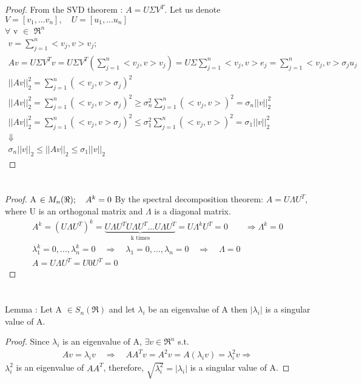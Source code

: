 \documentclass{article}
\begin{document}
	\section{}
	\begin{proof}
	From the SVD theorem : 
	$A=U\Sigma V^{T}.$
	Let us denote $V=[v_{1}, ... v_{n}],\quad U=[u_{1}, ... u_{n}]$ \\
	$\forall$ v $\in$ $\Re ^{n}$
	\begin{gather*}
	v = \sum_{j=1}^{n}<v_{j},v>v_{j}; \\
	Av=U\Sigma V^{T}v= U\Sigma V^{T}(\sum_{j=1}^{n}<v_{j},v>v_{j})=U\Sigma \sum_{j=1}^{n}<v_{j},v>e_{j}=\sum_{j=1}^{n}<v_{j},v>\sigma_{j}u_{j}\\
||Av||_{2}^{2}=\sum_{j=1}^{n}(<v_{j},v>\sigma_{j})^{2}\\
||Av||_{2}^{2}=	\sum_{j=1}^{n}(<v_{j},v>\sigma_{j})^{2} \geq \sigma_{n}^{2} \sum_{j=1}^{n}(<v_{j},v>)^{2} = \sigma_{n}||v||_{2}^{2} \\
||Av||_{2}^{2}=	\sum_{j=1}^{n}(<v_{j},v>\sigma_{j})^{2} \leq \sigma_{1}^{2} \sum_{j=1}^{n}(<v_{j},v>)^{2} = \sigma_{1}||v||_{2}^{2} \\
\Downarrow \\
\sigma_{n}||v||_{2} \leq ||Av||_{2} \leq \sigma_{1}||v||_{2}
	\end{gather*}
	\end{proof}

	\section{}
\begin{proof}	
	A $\in M_{n}(\Re);\quad A^{k}=0 \\ $ By the spectral decomposition theorem:
	$A=U\Lambda U^{T}$, where U is an orthogonal matrix and $\Lambda$ is a   	diagonal matrix.
	\begin{gather*}
	A^{k}=(U\Lambda U^{T})^{k}=\underbrace{U	\Lambda U^{T}U\Lambda U^{T}...U\Lambda U^{T}}_{\text{k times}}= U\Lambda^{k}U^{T}=0 \qquad \Rightarrow \Lambda^{k}=0 \\		
	\lambda_{1}^{k}=0,...,\lambda_{n}^{k}=0 \quad \Rightarrow \quad \lambda_{1}=0,...,\lambda_{n}=0 \quad \Rightarrow \quad \Lambda = 0 \\
	A=U\Lambda U^{T} = U 0 U^{T} = 0		
	\end{gather*}
	\end{proof}
	\section{}
	Lemma : Let A $\in S_{n}(\Re)$ and let $\lambda_{i}$ be an eigenvalue of A then $|\lambda_{i}|$ is a singular value of A.
	\begin{proof}
	Since $\lambda_{i}$ is an eigenvalue of A, $\exists v\in \Re^{n}$ s.t. \\
	\begin{gather*}	
	Av = \lambda_{i} v \quad \Rightarrow \quad AA^{T}v=A^{2}v=A(\lambda_{i} v) = \lambda_{i} ^{2} v \Rightarrow	
	\end{gather*}
	$\lambda_{i}^2$ is an eigenvalue of $AA^{T}$, therefore, $\sqrt{\lambda_{i}^2}=|\lambda_{i}|$ is a singular value of A.
	\end{proof}
	
\end{document}
